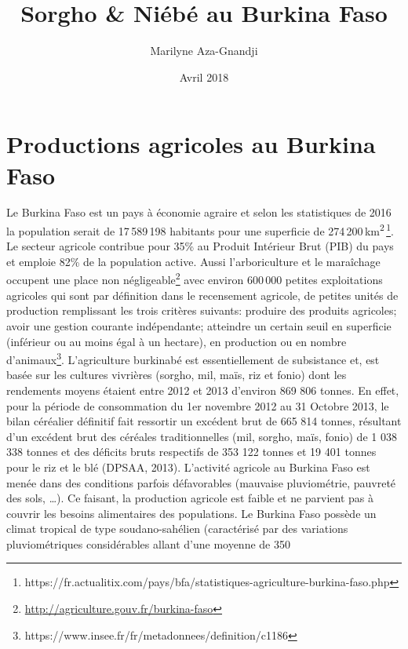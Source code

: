 \documentclass[a4paper,11pt]{article}
\begin{document}
\title{Sorgho \& Niébé au Burkina Faso}
\author{Marilyne Aza-Gnandji}
\date{Avril 2018} 

\maketitle
\tableofcontents

\section{Productions agricoles au Burkina Faso}

Le Burkina Faso est un pays à économie agraire\cite{Koulibi_FideleZONGO}
et selon les statistiques de 2016 la population serait de 17\,589\,198 habitants
pour une superficie de 274\,200\,km\textsuperscript{2}\,\footnote{https://fr.actualitix.com/pays/bfa/statistiques-agriculture-burkina-faso.php}. Le secteur agricole contribue pour 35\% au
Produit Intérieur Brut (PIB) du pays et emploie 82\% de la population
active. Aussi l'arboriculture et le maraîchage occupent une place
non négligeable\footnote{\url{http://agriculture.gouv.fr/burkina-faso}}
avec environ 600\,000 petites exploitations agricoles qui sont par
définition dans le recensement agricole, de petites unités de
production remplissant les trois critères suivants: produire des
produits agricoles; avoir une gestion courante indépendante; atteindre
un certain seuil en superficie (inférieur ou au moins égal à un
hectare), en production ou en nombre
d’animaux\footnote{https://www.insee.fr/fr/metadonnees/definition/c1186}.
L’agriculture burkinabé est essentiellement de subsistance et, est
basée sur les cultures vivrières (sorgho, mil, maïs, riz et fonio)
dont les rendements moyens étaient entre 2012 et 2013 d’environ 869
806 tonnes. En effet, pour la période de consommation du 1er novembre
2012 au 31 Octobre 2013, le bilan céréalier définitif fait ressortir
un excédent brut de 665 814 tonnes, résultant d’un excédent brut des
céréales traditionnelles (mil, sorgho, maïs, fonio) de 1 038 338
tonnes et des déficits bruts respectifs de 353 122 tonnes et 19 401
tonnes pour le riz et le blé (DPSAA, 2013). L’activité agricole au
Burkina Faso est menée dans des conditions parfois défavorables
(mauvaise pluviométrie, pauvreté des sols, \ldots{}). Ce faisant, la
production agricole est faible et ne parvient pas à couvrir les
besoins alimentaires des populations. Le Burkina Faso possède un
climat tropical de type soudano-sahélien (caractérisé par des
variations pluviométriques considérables allant d’une moyenne de 350
\end{document}
